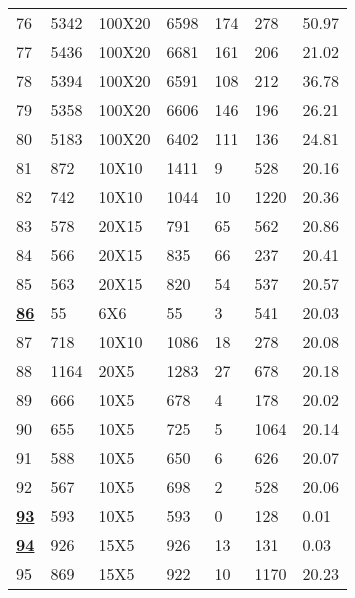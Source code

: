 \documentclass[14pt]{acmsiggraph}
\begin{document}
\begin{table}[h!]
\begin{center}
{\begin{tabular}{||lllllll}
					76  & 5342 & 100X20 & \cellcolor[rgb]{0.7,0.79,0.38}6598  & 174 & 278  & 50.97 \\
					77  & 5436 & 100X20 & \cellcolor[rgb]{0.69,0.78,0.38}6681 & 161 & 206  & 21.02 \\
					78  & 5394 & 100X20 & \cellcolor[rgb]{0.68,0.78,0.38}6591 & 108 & 212  & 36.78 \\
					79  & 5358 & 100X20 & \cellcolor[rgb]{0.69,0.78,0.38}6606 & 146 & 196  & 26.21 \\
					80  & 5183 & 100X20 & \cellcolor[rgb]{0.7,0.79,0.38}6402  & 111 & 136  & 24.81 \\
					81  & 872  & 10X10  & \cellcolor[rgb]{1,0.7,0.39}1411     & 9   & 528  & 20.16 \\
					82  & 742  & 10X10  & \cellcolor[rgb]{0.89,0.87,0.47}1044 & 10  & 1220 & 20.36 \\
					83  & 578  & 20X15  & \cellcolor[rgb]{0.85,0.85,0.45}791  & 65  & 562  & 20.86 \\
					84  & 566  & 20X15  & \cellcolor[rgb]{0.96,0.9,0.5}835    & 66  & 237  & 20.41 \\
					85  & 563  & 20X15  & \cellcolor[rgb]{0.94,0.89,0.49}820  & 54  & 537  & 20.57 \\
					\underline{\textbf{86}}  & 55   & 6X6    & \cellcolor[rgb]{0.43,0.67,0.27}55   & 3   & 541  & 20.03 \\
					87  & 718  & 10X10  & \cellcolor[rgb]{1,0.9,0.5}1086      & 18  & 278  & 20.08 \\
					88  & 1164 & 20X5   & \cellcolor[rgb]{0.55,0.72,0.32}1283 & 27  & 678  & 20.18 \\
					89  & 666  & 10X5   & \cellcolor[rgb]{0.45,0.68,0.28}678  & 4   & 178  & 20.02 \\
					90  & 655  & 10X5   & \cellcolor[rgb]{0.55,0.72,0.32}725  & 5   & 1064 & 20.14 \\
					91  & 588  & 10X5   & \cellcolor[rgb]{0.55,0.72,0.32}650  & 6   & 626  & 20.07 \\
					92  & 567  & 10X5   & \cellcolor[rgb]{0.69,0.78,0.38}698  & 2   & 528  & 20.06 \\
					\underline{\textbf{93}}  & 593  & 10X5   & \cellcolor[rgb]{0.43,0.67,0.27}593  & 0   & 128  & 0.01  \\
					\underline{\textbf{94}}  & 926  & 15X5   & \cellcolor[rgb]{0.43,0.67,0.27}926  & 13  & 131  & 0.03  \\
					95  & 869  & 15X5   & \cellcolor[rgb]{0.5,0.7,0.3}922     & 10  & 1170 & 20.23 \\

\end{tabular}}
\end{center}
\end{table}
\end{document}
